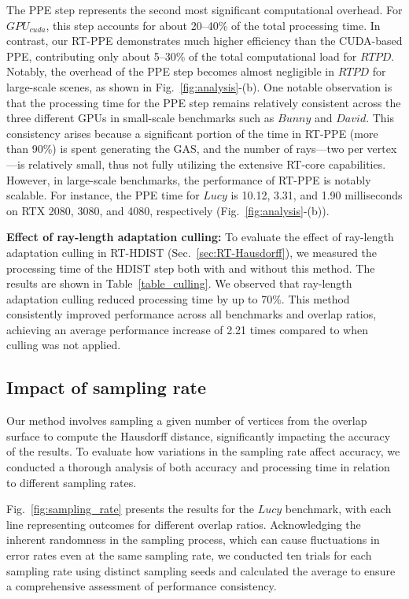 The PPE step represents the second most significant computational overhead.
For $GPU_{cuda}$, this step accounts for about 20–40\% of the total processing time.
In contrast, our RT-PPE demonstrates much higher efficiency than the CUDA-based PPE, contributing only about 5–30\% of the total computational load for $RTPD$.
Notably, the overhead of the PPE step becomes almost negligible in $RTPD$ for large-scale scenes, as shown in Fig.~\ref{fig:analysis}-(b).
%
One notable observation is that the processing time for the PPE step remains relatively consistent across the three different GPUs in small-scale benchmarks such as $Bunny$ and $David$.
This consistency arises because a significant portion of the time in RT-PPE (more than 90\%) is spent generating the GAS, and the number of rays—two per vertex—is relatively small, thus not fully utilizing the extensive RT-core capabilities.
%
However, in large-scale benchmarks, the performance of RT-PPE is notably scalable.
For instance, the PPE time for $Lucy$ is 10.12, 3.31, and 1.90 milliseconds on RTX 2080, 3080, and 4080, respectively (Fig.~\ref{fig:analysis}-(b)).


\textbf{Effect of ray-length adaptation culling:}
To evaluate the effect of ray-length adaptation culling in RT-HDIST (Sec.~\ref{sec:RT-Hausdorff}), we measured the processing time of the HDIST step both with and without this method.
The results are shown in Table~\ref{table_culling}. 
We observed that ray-length adaptation culling reduced processing time by up to 70\%.
This method consistently improved performance across all benchmarks and overlap ratios, achieving an average performance increase of 2.21 times compared to when culling was not applied.



\subsection{Impact of sampling rate}\label{subsec:sampling_rate}
Our method involves sampling a given number of vertices from the overlap surface to compute the Hausdorff distance, significantly impacting the accuracy of the results.
To evaluate how variations in the sampling rate affect accuracy, we conducted a thorough analysis of both accuracy and processing time in relation to different sampling rates.

Fig.~\ref{fig:sampling_rate} presents the results for the $Lucy$ benchmark, with each line representing outcomes for different overlap ratios.
Acknowledging the inherent randomness in the sampling process, which can cause fluctuations in error rates even at the same sampling rate, we conducted ten trials for each sampling rate using distinct sampling seeds and calculated the average to ensure a comprehensive assessment of performance consistency.


